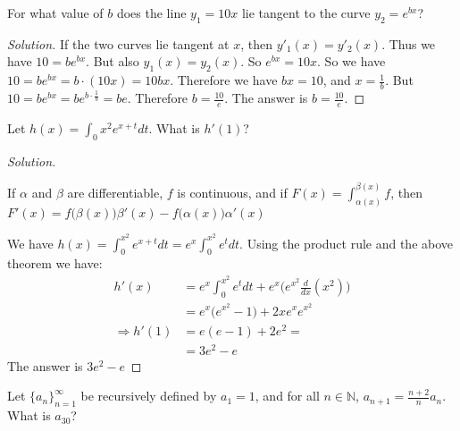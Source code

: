 \documentclass[crop=false,class=book]{standalone}
\begin{document}
        \begin{problem}
        For what value of $b$ does the line $y_1=10x$ lie tangent to the curve $y_2=e^{bx}$?
        \end{problem}
        \begin{proof}[Solution]
        If the two curves lie tangent at $x$, then $y'_1(x) = y'_2(x)$. Thus we have $10 = be^{bx}$. But also $y_1(x) = y_2(x)$. So $e^{bx} = 10x$. So we have $10 = be^{bx} = b\cdot (10x) = 10bx$. Therefore we have $bx = 10$, and $x = \frac{1}{b}$. But $10 = b e^{bx} = b e^{b\cdot \frac{1}{b}} = be$. Therefore $b = \frac{10}{e}$. The answer is $b = \frac{10}{e}$.
        \end{proof}
        \begin{problem}
        Let $h(x)=\int_{0}{x^{2}}e^{x+t}dt$. What is $h'(1)$?
        \end{problem}
        \begin{proof}[Solution]
        \begin{theorem*}
        If $\alpha$ and $\beta$ are differentiable, $f$ is continuous, and if $F(x) = \int_{\alpha(x)}^{\beta(x)}f$, then $F'(x) = f\big(\beta(x)\big)\beta'(x) - f\big(\alpha(x)\big)\alpha'(x)$
        \end{theorem*}
        We have $h(x) = \int_{0}^{x^2}e^{x+t}dt = e^x \int_{0}^{x^2}e^t dt$. Using the product rule and the above theorem we have:
        \begin{align*}
            h'(x) &= e^x \int_{0}^{x^2} e^t dt + e^{x} \big(e^{x^2}\frac{d}{dx}(x^2)\big) \\
            &= e^x\big(e^{x^2}-1\big) + 2xe^xe^{x^2} \\
            \Rightarrow h'(1) &= e(e-1) + 2e^2 = \\
            &= 3e^2 - e
        \end{align*}
        The answer is $3e^{2}-e$
        \end{proof}
        \begin{problem}
        Let $\{a_n\}_{n=1}^{\infty}$ be recursively defined by $a_1 = 1$, and for all $n\in \mathbb{N}$, $a_{n+1} = \frac{n+2}{n}a_n$. What is $a_{30}$?
        \end{problem}
\end{document}
